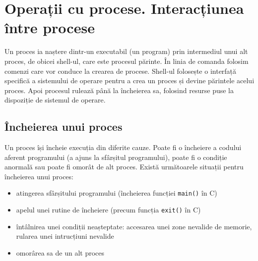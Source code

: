 
\section{Operații cu procese. Interacțiunea între procese}
\label{sec:process-operatii}

Un proces ia naștere dintr-un executabil (un program) prin intermediul unui alt
proces, de obicei shell-ul, care este procesul părinte. În linia de comanda
folosim comenzi care vor conduce la crearea de procese. Shell-ul folosește o
interfață specifică a sistemului de operare pentru a crea un proces și devine
părintele acelui proces. Apoi procesul rulează până la încheierea sa, folosind
resurse puse la dispoziție de sistemul de operare.

\subsection{Încheierea unui proces}
\label{sec:process-operatii-incheiere}

Un proces își încheie execuția din diferite cauze. Poate fi o încheiere a
codului aferent programului (a ajuns la sfârșitul programului), poate fi o
condiție anormală sau poate fi omorât de alt proces. Există următoarele situații
pentru încheierea unui proces:

\begin{itemize}
  \item atingerea sfârșitului programului (încheierea funcției \texttt{main()} în
		C)
              \item apelul unei rutine de încheiere (precum funcția \texttt{exit()} în C)
	\item întâlnirea unei condiții neașteptate: accesarea unei zone nevalide
		de memorie, rularea unei intrucțiuni nevalide
	\item omorârea sa de un alt proces
\end{itemize}

